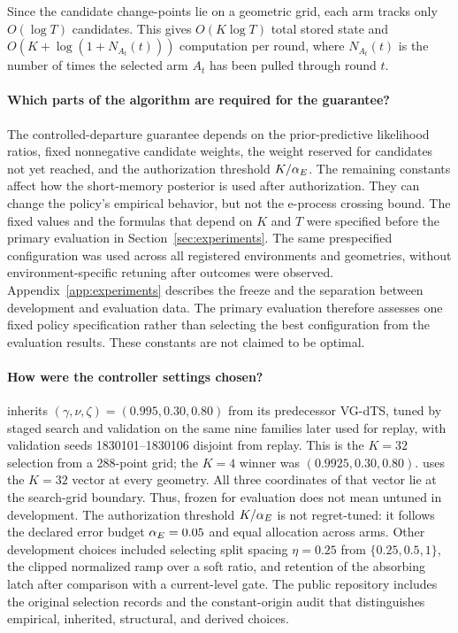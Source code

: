 Since the candidate change-points lie on a geometric grid, each arm tracks
only $O(\log T)$ candidates.
This gives $O(K\log T)$ total stored state and $O(K+\log(1+N_{A_t}(t)))$ computation per round, where $N_{A_t}(t)$ is the
number of times the selected arm $A_t$ has been pulled through round $t$.

\paragraph{Which parts of the algorithm are required for the guarantee?}
The controlled-departure guarantee depends on the prior-predictive likelihood
ratios, fixed nonnegative candidate weights, the weight
reserved for candidates not yet reached, and the authorization threshold
$K/\alpha_E$.
The remaining constants affect how the short-memory posterior is used after authorization.
They can change the policy's empirical behavior, but not the e-process crossing bound.
The fixed values and the formulas that depend on $K$ and $T$ were specified before the primary evaluation in Section~\ref{sec:experiments}.
The same prespecified configuration was used across all registered environments and geometries, without environment-specific retuning after outcomes were observed.
Appendix~\ref{app:experiments} describes the freeze and the separation between development and evaluation data.
The primary evaluation therefore assesses one fixed policy specification rather than selecting the best configuration from the evaluation results.
These constants are not claimed to be optimal.

\paragraph{How were the controller settings chosen?}
\method{} inherits $(\gamma,\nu,\zeta)=(0.995,0.30,0.80)$ from its predecessor
VG-dTS, tuned by staged search and validation on the same nine families later
used for replay, with validation seeds 1830101--1830106 disjoint from replay.
This is the $K=32$ selection from a 288-point grid; the $K=4$ winner was
$(0.9925,0.30,0.80)$. \method{} uses the $K=32$ vector at every geometry.
All three coordinates of that vector lie at the search-grid boundary.
Thus, frozen for evaluation does not mean untuned in development.
The authorization threshold $K/\alpha_E$ is not regret-tuned: it follows the
declared error budget $\alpha_E=0.05$ and equal allocation across arms.
Other development choices included selecting split spacing $\eta=0.25$ from
$\{0.25,0.5,1\}$, the clipped normalized ramp over a soft ratio, and retention
of the absorbing latch after comparison with a current-level gate. The public
repository includes the original selection records and the constant-origin
audit that distinguishes empirical, inherited, structural, and derived choices.

